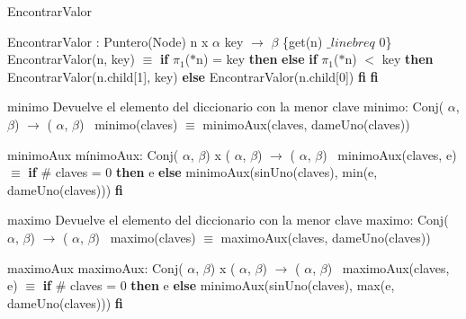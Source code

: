\begin{DoxyParagraph}{Encontrar\+Valor}


Encontrar\+Valor \+: Puntero(\+Node) n x $\alpha$ key $\to$ $\beta$ \{get(n) $\_linebr eq$ 0\}~\newline
 Encontrar\+Valor(n, key) $\equiv$ {\bfseries if} $\pi_1$($\ast$n) = key {\bfseries then}  {\bfseries else} {\bfseries if} $\pi_1$($\ast$n) $<$ key {\bfseries then} Encontrar\+Valor(n.\+child\mbox{[}1\mbox{]}, key) {\bfseries else} Encontrar\+Valor(n.\+child\mbox{[}0\mbox{]}) {\bfseries fi} {\bfseries fi} 


\end{DoxyParagraph}
\begin{DoxyParagraph}{minimo}
Devuelve el elemento del diccionario con la menor clave minimo\+: Conj( $\alpha$, $\beta$) $\to$ ( $\alpha$, $\beta$)~\newline
 minimo(claves) $\equiv$ minimo\+Aux(claves, dame\+Uno(claves)) 
\end{DoxyParagraph}


\begin{DoxyParagraph}{minimo\+Aux}
mínimo\+Aux\+: Conj( $\alpha$, $\beta$) x ( $\alpha$, $\beta$) $\to$ ( $\alpha$, $\beta$)~\newline
 minimo\+Aux(claves, e) $\equiv$ {\bfseries if} \# claves = 0 {\bfseries then} e {\bfseries else} minimo\+Aux(sin\+Uno(claves), min(e, dame\+Uno(claves))) {\bfseries fi} 
\end{DoxyParagraph}


\begin{DoxyParagraph}{maximo}
Devuelve el elemento del diccionario con la menor clave maximo\+: Conj( $\alpha$, $\beta$) $\to$ ( $\alpha$, $\beta$)~\newline
 maximo(claves) $\equiv$ maximo\+Aux(claves, dame\+Uno(claves)) 
\end{DoxyParagraph}


\begin{DoxyParagraph}{maximo\+Aux}
maximo\+Aux\+: Conj( $\alpha$, $\beta$) x ( $\alpha$, $\beta$) $\to$ ( $\alpha$, $\beta$)~\newline
 maximo\+Aux(claves, e) $\equiv$ {\bfseries if} \# claves = 0 {\bfseries then} e {\bfseries else} minimo\+Aux(sin\+Uno(claves), max(e, dame\+Uno(claves))) {\bfseries fi} 
\end{DoxyParagraph}
